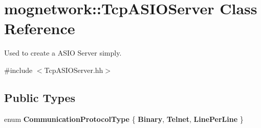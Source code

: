 \hypertarget{classmognetwork_1_1_tcp_a_s_i_o_server}{\section{mognetwork\-:\-:Tcp\-A\-S\-I\-O\-Server Class Reference}
\label{classmognetwork_1_1_tcp_a_s_i_o_server}
}


Used to create a A\-S\-I\-O Server simply.  




{\ttfamily \#include $<$Tcp\-A\-S\-I\-O\-Server.\-hh$>$}

\subsection*{Public Types}
\begin{DoxyCompactItemize}
\item 
enum {\bfseries Communication\-Protocol\-Type} \{ {\bfseries Binary}, 
{\bfseries Telnet}, 
{\bfseries Line\-Per\-Line}
 \}
\end{DoxyCompactItemize}
